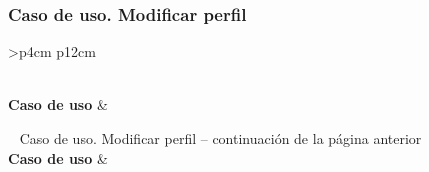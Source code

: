 \subsubsection{Caso de uso. Modificar perfil} \label{sec:cu_modificar-perfil}
\begin{longtable}{
    >{}p{4cm}
    p{12cm}
    }
    \caption{Caso de uso. Modificar perfil} \label{table:cu_modificar-perfil} \\
    \toprule
    \textbf{Caso de uso} &  \\
    \endfirsthead
    
    {{ \tablename\ \thetable{} Caso de uso. Modificar perfil -- continuación de la página anterior}} \\
    \toprule
    \textbf{Caso de uso} &  \\
    \midrule
    \endhead
    
    \midrule
     \\ 
    \endfoot
    
    \bottomrule
    \endlastfoot
    

\end{longtable}
